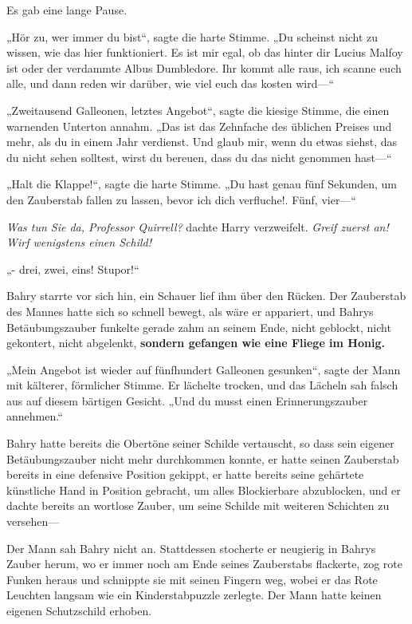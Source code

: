 {Es gab eine lange Pause.

„Hör zu, wer immer du bist“, sagte die harte Stimme. „Du scheinst nicht zu wissen, wie das hier funktioniert. Es ist mir egal, ob das hinter dir Lucius Malfoy ist oder der verdammte Albus Dumbledore. Ihr kommt alle raus, ich scanne euch alle, und dann reden wir darüber, wie viel euch das kosten wird—“

„Zweitausend Galleonen, letztes Angebot“, sagte die kiesige Stimme, die einen warnenden Unterton annahm. „Das ist das Zehnfache des üblichen Preises und mehr, als du in einem Jahr verdienst. Und glaub mir, wenn du etwas siehst, das du nicht sehen solltest, wirst du bereuen, dass du das nicht genommen hast—“

„Halt die Klappe!“, sagte die harte Stimme. „Du hast genau fünf Sekunden, um den Zauberstab fallen zu lassen, bevor ich dich verfluche!. Fünf, vier—“

\emph{\hfill\break Was tun Sie da, Professor Quirrell?} dachte Harry verzweifelt. \emph{Greif zuerst an! Wirf wenigstens einen Schild!}

„- drei, zwei, eins! Stupor!“

Bahry starrte vor sich hin, ein Schauer lief ihm über den Rücken. Der Zauberstab des Mannes hatte sich so schnell bewegt, als wäre er appariert, und Bahrys Betäubungszauber funkelte gerade zahm an seinem Ende, nicht geblockt, nicht gekontert, nicht abgelenkt, \textbf{sondern gefangen wie eine Fliege im Honig.}

„Mein Angebot ist wieder auf fünfhundert Galleonen gesunken“, sagte der Mann mit kälterer, förmlicher Stimme. Er lächelte trocken, und das Lächeln sah falsch aus auf diesem bärtigen Gesicht. „Und du musst einen Erinnerungszauber annehmen.“

Bahry hatte bereits die Obertöne seiner Schilde vertauscht, so dass sein eigener Betäubungszauber nicht mehr durchkommen konnte, er hatte seinen Zauberstab bereits in eine defensive Position gekippt, er hatte bereits seine gehärtete künstliche Hand in Position gebracht, um alles Blockierbare abzublocken, und er dachte bereits an wortlose Zauber, um seine Schilde mit weiteren Schichten zu versehen—

Der Mann sah Bahry nicht an. Stattdessen stocherte er neugierig in Bahrys Zauber herum, wo er immer noch am Ende seines Zauberstabs flackerte, zog rote Funken heraus und schnippte sie mit seinen Fingern weg, wobei er das Rote Leuchten langsam wie ein Kinderstabpuzzle zerlegte. Der Mann hatte keinen eigenen Schutzschild erhoben.

}
